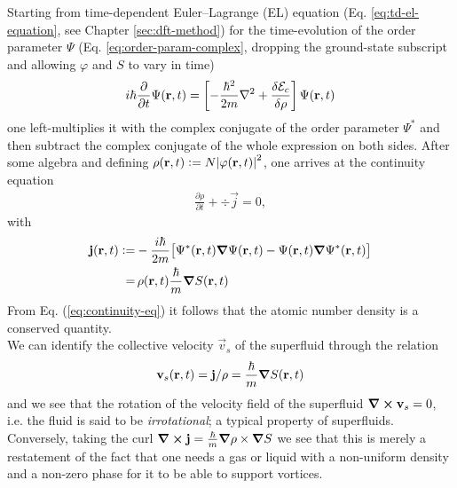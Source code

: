 			Starting from time-dependent Euler--Lagrange (EL) equation (Eq. \ref{eq:td-el-equation}, see Chapter \ref{sec:dft-method}) for the time-evolution of the order parameter $\Psi$ (Eq. \ref{eq:order-param-complex}, dropping the ground-state subscript and allowing $\varphi$ and $S$ to vary in time)
			\begin{align}
				i\hbar\frac{\partial}{\partial t} \Psi({\mathbf r},t) = \left[-\frac{\hbar^2}{2m}\laplacian + \frac{\delta{\cal E}_{c}}{\delta\rho}\right]\Psi(\textbf{r},t)
			\end{align}
			one left-multiplies it with the complex conjugate of the order parameter $\Psi^*$ and then subtract the complex conjugate of the whole expression on both sides. After some algebra and defining $\rho(\bm{\mathrm{r}},t)\vcentcolon=N\abs{\varphi(\bm{\mathrm{r}},t)}^2$, one arrives at the continuity equation
			\begin{align}
				\frac{\partial\rho}{\partial t} + \div{\vec{j}}=0, \label{eq:continuity-eq}
			\end{align}
			with
			\begin{align}
				\bm{\mathrm{j}}(\bm{\mathrm{r}},t) \vcentcolon=& -\frac{i\hbar}{2m}\qty\big[\Psi^*(\bm{\mathrm{r}},t)\grad{\Psi}(\bm{\mathrm{r}},t) - \Psi(\bm{\mathrm{r}},t)\grad{\Psi^*}(\bm{\mathrm{r}},t)] \\
					=&\,\rho(\bm{\mathrm{r}},t)\frac{\hbar}{m}\grad{S(\bm{\mathrm{r}},t)}
			\end{align}
			From Eq. (\ref{eq:continuity-eq}) it follows that the atomic number density is a conserved quantity.\\
			
			We can identify the collective velocity $\vec{v}_s$ of the superfluid through the relation
			\begin{align}
				\bm{\mathrm{v}}_s(\bm{\mathrm{r}},t) = \bm{\mathrm{j}}/\rho=\frac{\hbar}{m}\grad{S(\bm{\mathrm{r}},t)} \label{eq:velocity-field}
			\end{align}
			and we see that the rotation of the velocity field of the superfluid $\curl{\bm{\mathrm{v}}_s}=0$, i.e. the fluid is said to be \emph{irrotational}; a typical property of superfluids. Conversely, taking the curl $\curl{\bm{\mathrm{j}}}=\frac{\hbar}{m}\grad{\rho}\times\grad{S}$ we see that this is merely a restatement of the fact that one needs a gas or liquid with a non-uniform density and a non-zero phase for it to be able to support vortices.\\
			
